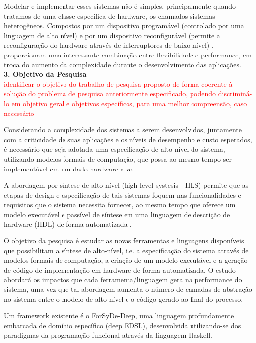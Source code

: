 Modelar e implementar esses sistemas não é simples, principalmente quando tratamos de uma classe específica de hardware, os chamados sistemas heterogêneos. Compostos por um dispositivo programável (controlado por uma linguagem de alto nível) e por um dispositivo reconfigurável (permite a reconfiguração do hardware através de interruptores de baixo nível) \cite{Loubach2016a}, proporcionam uma interessante combinação entre flexibilidade e performance, em troca do aumento da complexidade durante o desenvolvimento das aplicações.\\

\noindent
\textbf{3. Objetivo da Pesquisa}\\
\noindent
\textcolor{red}{identificar o objetivo do trabalho de pesquisa proposto de forma coerente à solução do problema de pesquisa anteriormente especificado, podendo discriminá-lo em objetivo geral e objetivos específicos, para uma melhor compreensão, caso necessário}

Considerando a complexidade dos sistemas a serem desenvolvidos, juntamente com a criticidade de suas aplicações e os níveis de desempenho e custo esperados, é necessário que seja adotada uma especificação de alto nível do sistema, utilizando modelos formais de computação, que possa ao mesmo tempo  ser implementável em um dado hardware alvo.

A abordagem por síntese de alto-nível (high-level systesis - HLS) permite que as etapas de design e especificação de tais sistemas foquem nas funcionalidades e requisitos que o sistema necessita fornecer, ao mesmo tempo que oferece um modelo executável e passível de síntese em uma linguagem de descrição de hardware (HDL) de forma automatizada \cite{Loubach2022a}.

O objetivo da pesquisa é estudar as novas ferramentas e linguagens disponíveis que possibilitam a síntese de alto-nível, i.e. a especificação do sistema através de modelos formais de computação, a criação de um modelo executável e a geração de código de implementação em hardware de forma automatizada. O estudo abordará os impactos que cada ferramenta/linguagem gera na performance do sistema, uma vez que tal abordagem aumenta o número de camadas de abstração no sistema entre o modelo de alto-nível e o código gerado ao final do processo.

Um framework existente é o ForSyDe-Deep, uma linguagem profundamente embarcada de domínio específico (deep EDSL), desenvolvida utilizando-se dos paradigmas da programação funcional através da linguagem Haskell. \cite{ForSyDe-Deep}

